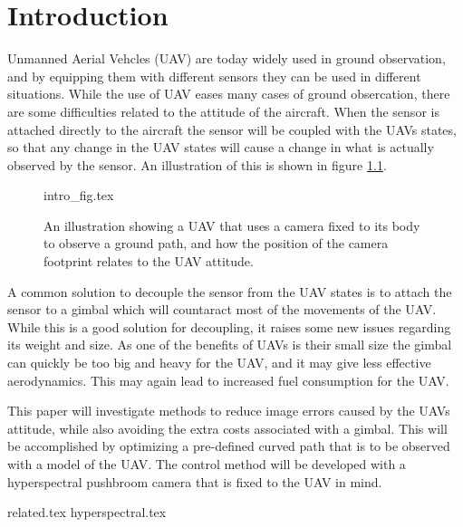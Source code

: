 \chapter{Introduction}

Unmanned Aerial Vehcles (UAV) are today widely used in ground observation, and by equipping them with different sensors they can be used in different situations. While the use of UAV eases many cases of ground obsercation, there are some difficulties related to the attitude of the aircraft. When the sensor is attached directly to the aircraft the sensor will be coupled with the UAVs states, so that any change in the UAV states will cause a change in what is actually observed by the sensor. An illustration of this is shown in figure \ref{fig:intro_fig}.

\begin{figure}
	{intro_fig.tex}
	\caption{An illustration showing a UAV that uses a camera fixed to its body to observe a ground path, and how the position of the camera footprint relates to the UAV attitude.}
	\label{fig:intro_fig}
\end{figure}

A common solution to decouple the sensor from the UAV states is to attach the sensor to a gimbal which will countaract most of the movements of the UAV. While this is a good solution for decoupling, it raises some new issues regarding its weight and size. As one of the benefits of UAVs is their small size the gimbal can quickly be too big and heavy for the UAV, and it may give less effective aerodynamics. This may again lead to increased fuel consumption for the UAV.

This paper will investigate methods to reduce image errors caused by the UAVs attitude, while also avoiding the extra costs associated with a gimbal. This will be accomplished by optimizing a pre-defined curved path that is to be observed with a model of the UAV. The control method will be developed with a hyperspectral pushbroom camera that is fixed to the UAV in mind.


{related.tex}
{hyperspectral.tex}
